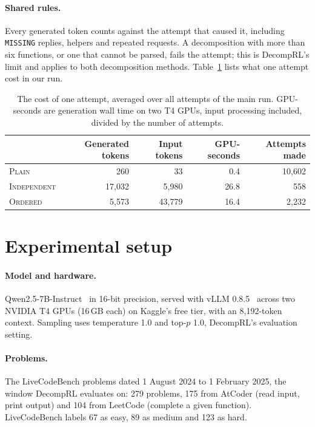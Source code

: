 \documentclass[11pt]{article}
\newcommand{\plain}{\textsc{Plain}}
\newcommand{\indep}{\textsc{Independent}}
\newcommand{\ordered}{\textsc{Ordered}}
\begin{document}
\paragraph{Shared rules.} Every generated token counts against the attempt that caused it, including \texttt{MISSING}
replies, helpers and repeated requests. A decomposition with more than six functions, or one that cannot be parsed,
fails the attempt; this is DecompRL's limit and applies to both decomposition methods.
Table~\ref{tab:cost} lists what one attempt cost in our run.

\begin{table}[t]
\centering
\caption{The cost of one attempt, averaged over all attempts of the main run. GPU-seconds are generation wall time on
two T4 GPUs, input processing included, divided by the number of attempts.}
\label{tab:cost}
\begin{tabular}{lrrrr}
\toprule
 & Generated tokens & Input tokens & GPU-seconds & Attempts made \\
\midrule
\plain{}  & 260    & 33     & 0.4  & 10,602 \\
\indep{}  & 17,032 & 5,980  & 26.8 & 558 \\
\ordered{} & 5,573 & 43,779 & 16.4 & 2,232 \\
\bottomrule
\end{tabular}
\end{table}

\section{Experimental setup}
\label{sec:setup}

\paragraph{Model and hardware.} Qwen2.5-7B-Instruct~\citep{qwen2024qwen25} in 16-bit precision, served with vLLM
0.8.5~\citep{kwon2023vllm} across two NVIDIA T4 GPUs (16\,GB each) on Kaggle's free tier, with an 8,192-token context.
Sampling uses temperature 1.0 and top-$p$ 1.0, DecompRL's evaluation setting.

\paragraph{Problems.} The LiveCodeBench problems dated 1 August 2024 to 1 February 2025, the window DecompRL evaluates
on: 279 problems, 175 from AtCoder (read input, print output) and 104 from LeetCode (complete a given function).
LiveCodeBench labels 67 as easy, 89 as medium and 123 as hard.
\end{document}
